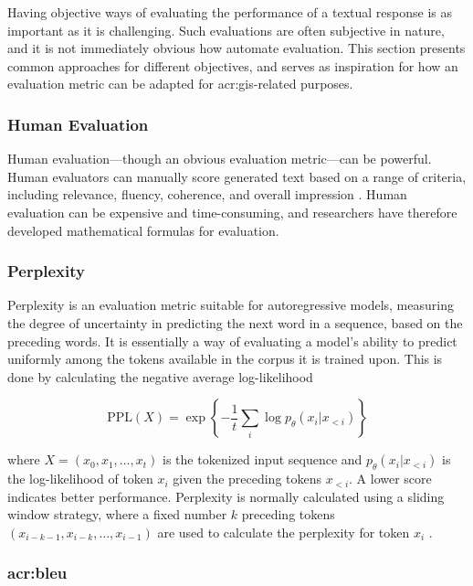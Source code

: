 Having objective ways of evaluating the performance of a textual response is as important as it is challenging. Such evaluations are often subjective in nature, and it is not immediately obvious how automate evaluation. This section presents common approaches for different objectives, and serves as inspiration for how an evaluation metric can be adapted for \acrshort{acr:gis}-related purposes.

\subsubsection{Human Evaluation}

Human evaluation---though an obvious evaluation metric---can be powerful. Human evaluators can manually score generated text based on a range of criteria, including relevance, fluency, coherence, and overall impression \citep{ceylanLargeLanguageModel2023}. Human evaluation can be expensive and time-consuming, and researchers have therefore developed mathematical formulas for evaluation.

\subsubsection{Perplexity}

Perplexity is an evaluation metric suitable for autoregressive models, measuring the degree of uncertainty in predicting the next word in a sequence, based on the preceding words. It is essentially a way of evaluating a model's ability to predict uniformly among the tokens available in the corpus it is trained upon. This is done by calculating the negative average log-likelihood

\begin{equation}
    \text{PPL}(X) = \exp \left\{ -\frac{1}{t} \sum_{i} \log p_\theta(x_i | x_{<i}) \right\}
    \label{eq:ppl}
\end{equation}

\noindent where $X = (x_0, x_1, \ldots, x_t)$ is the tokenized input sequence and $p_\theta(x_i | x_{<i})$ is the log-likelihood of token $x_i$ given the preceding tokens $x_{<i}$. A lower score indicates better performance. Perplexity is normally calculated using a sliding window strategy, where a fixed number $k$ preceding tokens $(x_{i-k-1},x_{i-k},\ldots,x_{i-1})$ are used to calculate the perplexity for token $x_i$ \citep{huggingfacePerplexityFixedlengthModels}.

\subsubsection[BiLingual Evaluation Understudy (BLEU)]{\acrfull{acr:bleu}}

